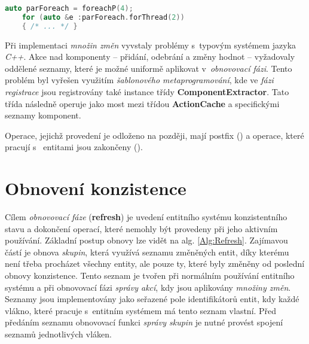 \begin{lstlisting}[language=C++]
	auto parForeach = foreachP(4);
	for (auto &e :parForeach.forThread(2))
	{ /* ... */ }
\end{lstlisting}

Při implementaci \emph{množin změn} vyvstaly problémy s~typovým systémem jazyka \emph{C++}. Akce nad komponenty -- přidání, odebrání a změny hodnot -- vyžadovaly oddělené seznamy, které je možné uniformě aplikovat v~\emph{obnovovací fázi}. Tento problém byl vyřešen využitím \emph{šablonového metaprogramování}, kde ve \emph{fázi registrace} jsou registrovány také instance třídy \textbf{ComponentExtractor}. Tato třída následně operuje jako most mezi třídou \textbf{ActionCache} a specifickými seznamy komponent.

Operace, jejichž provedení je odloženo na později, mají postfix  () a operace, které pracují s~ entitami jsou zakončeny  ().

\section{Obnovení konzistence}

Cílem \emph{obnovovací fáze} (\textbf{refresh}) je uvedení entitního systému konzistentního stavu a dokončení operací, které nemohly být provedeny při jeho aktivním používání. Základní postup obnovy lze vidět na alg. \ref{Alg:Refresh}. Zajímavou částí je obnova \emph{skupin}, která využívá seznamu změněných entit, díky kterému není třeba procházet všechny entity, ale pouze ty, které byly změněny od poslední obnovy konzistence. Tento seznam je tvořen při normálním používání entitního systému a při obnovovací fázi \emph{správy akcí}, kdy jsou aplikovány \emph{množiny změn}. Seznamy jsou implementovány jako seřazené pole identifikátorů entit, kdy každé vlákno, které pracuje s~entitním systémem má tento seznam vlastní. Před předáním seznamu obnovovací funkci \emph{správy skupin} je nutné provést spojení seznamů jednotlivých vláken.

